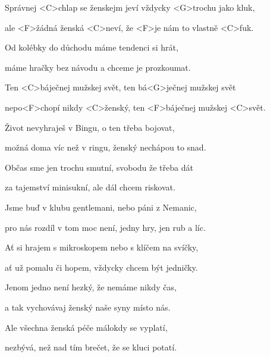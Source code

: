 

\zs
Správnej <C>chlap se ženskejm jeví vždycky <G>trochu jako kluk,

ale <F>žádná ženská <C>neví, že <F>je nám to vlastně <C>fuk.

Od kolébky do důchodu máme tendenci si hrát,

máme hračky bez návodu a chceme je prozkoumat.
\ks

\zr
Ten <C>báječnej mužskej svět, ten bá<G>ječnej mužskej svět

nepo<F>chopí nikdy <C>ženský, ten <F>báječnej mužskej <C>svět.
\kr

\zs
Život nevyhraješ v Bingu, o ten třeba bojovat,

možná doma víc než v ringu, ženský nechápou to snad.

Občas sme jen trochu smutní, svobodu že třeba dát

za tajemství minisukní, ale dál chcem riskovat.
\ks

\zr\kr

\zs
Jsme buď v klubu gentlemani, nebo páni z Nemanic,

pro nás rozdíl v tom moc není, jedny hry, jen rub a líc.

Ať si hrajem s mikroskopem nebo s klíčem na svíčky,

ať už pomalu či hopem, vždycky chcem být jedničky.
\ks

\zr \kr

\zs
Jenom jedno není hezký, že nemáme nikdy čas,

a tak vychovávaj ženský naše syny místo nás.

Ale všechna ženská péče málokdy se vyplatí,

nezbývá, než nad tím brečet, že se kluci potatí.
\ks

\zr \kr

\kp
